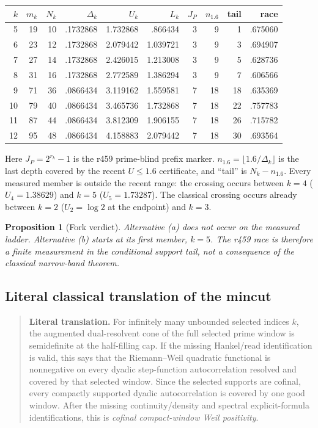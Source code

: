 \documentclass[11pt]{article}
\newtheorem{prop}{Proposition}
\begin{document}
\begin{center}
\small
\begin{tabular}{@{}rrrrrrrrrr@{}}
\toprule
$k$ & $m_k$ & $N_k$ & $\Delta_k$ & $U_k$ & $L_k$ &
$J_P$ & $n_{1.6}$ & tail & race\\
\midrule
5  & 19 & 10 & .1732868 & 1.732868 & .866434 & 3 & 9  & 1  & .675060\\
6  & 23 & 12 & .1732868 & 2.079442 & 1.039721 & 3 & 9  & 3  & .694907\\
7  & 27 & 14 & .1732868 & 2.426015 & 1.213008 & 3 & 9  & 5  & .628736\\
8  & 31 & 16 & .1732868 & 2.772589 & 1.386294 & 3 & 9  & 7  & .606566\\
9  & 71 & 36 & .0866434 & 3.119162 & 1.559581 & 7 & 18 & 18 & .635369\\
10 & 79 & 40 & .0866434 & 3.465736 & 1.732868 & 7 & 18 & 22 & .757783\\
11 & 87 & 44 & .0866434 & 3.812309 & 1.906155 & 7 & 18 & 26 & .715782\\
12 & 95 & 48 & .0866434 & 4.158883 & 2.079442 & 7 & 18 & 30 & .693564\\
\bottomrule
\end{tabular}
\end{center}

\noindent
Here $J_P=2^{r_k}-1$ is the r459 prime-blind prefix marker.
$n_{1.6}=\lfloor1.6/\Delta_k\rfloor$ is the last depth covered
by the recent $U\le1.6$ certificate, and ``tail'' is
$N_k-n_{1.6}$.
Every measured member is outside the recent range:
the crossing occurs between $k=4$ ($U_4=1.38629$) and
$k=5$ ($U_5=1.73287$).
The classical crossing occurs already between $k=2$
($U_2=\log2$ at the endpoint) and $k=3$.

\begin{prop}[Fork verdict]\label{prop:fork}
Alternative (a) does not occur on the measured ladder.
Alternative (b) starts at its first member, $k=5$.
The r459 race is therefore a finite measurement in the
conditional support tail, not a consequence of the classical
narrow-band theorem.
\end{prop}

\subsection{Literal classical translation of the mincut}

\begin{quote}
\textbf{Literal translation.}
For infinitely many unbounded selected indices $k$, the augmented
dual-resolvent cone of the full selected prime window is
semidefinite at the half-filling cap.  If the missing
Hankel/read identification is valid, this says that the
Riemann--Weil quadratic functional is nonnegative on every
dyadic step-function autocorrelation resolved and covered by
that selected window.  Since the selected supports are cofinal,
every compactly supported dyadic autocorrelation is covered by
one good window.  After the missing continuity/density and
spectral explicit-formula identifications, this is
\emph{cofinal compact-window Weil positivity}.
\end{quote}
\end{document}
